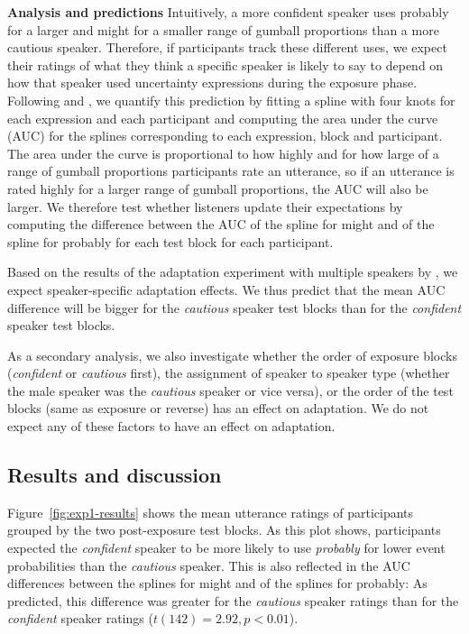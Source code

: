 \noindent \textbf{Analysis and predictions} 
Intuitively, a more confident speaker uses {\sc probably} for a larger and {\sc might} 
for a smaller range of gumball proportions than a more cautious speaker. Therefore, 
if participants track these different uses, we expect their ratings of what they think 
a specific speaker is likely to say to depend on how that speaker used 
uncertainty expressions during the exposure phase. Following \textcite{Yildirim2016} and 
\textcite{Schuster2018}, we quantify this prediction by fitting a spline with four knots for each 
expression and each participant and computing the area under the curve (AUC) for the splines 
corresponding to each expression, block and participant. The area under the curve is proportional 
to how highly and for how large of a range of gumball proportions participants rate an utterance, so 
if an utterance is rated highly for a larger range of gumball proportions, the AUC will also be larger. 
We therefore test whether listeners update their expectations by computing the difference between 
the AUC of the spline for {\sc might} and of the spline for {\sc probably} for each test block for each 
participant. 

Based on the results of the adaptation experiment with multiple speakers by \textcite{Yildirim2016},
we expect speaker-specific adaptation effects. We thus predict that the mean AUC difference
will be bigger for the \emph{cautious} speaker test blocks than for the \emph{confident} speaker test blocks.

As a secondary analysis, we also investigate whether the order of exposure blocks 
(\textit{confident} or \textit{cautious} first), the assignment of speaker to speaker type 
(whether the male speaker was the \textit{cautious} speaker or vice versa), or the order 
of the test blocks (same as exposure or reverse) has an effect on adaptation. 
We do not expect any of these factors to have an effect on adaptation.



\subsection{Results and discussion}

Figure~\ref{fig:exp1-results} shows the mean utterance ratings of participants grouped by the two post-exposure test blocks. 
As this plot shows, participants expected the \textit{confident} speaker to be more likely to use \textit{probably} for lower 
event probabilities than the \textit{cautious} speaker. This is also reflected in the AUC differences between the splines for 
{\sc might} and of the splines for {\sc probably}: As predicted, this difference was greater for the  \emph{cautious }speaker 
ratings than for the \emph{confident} speaker ratings ($t(142)=2.92, p < 0.01$).

